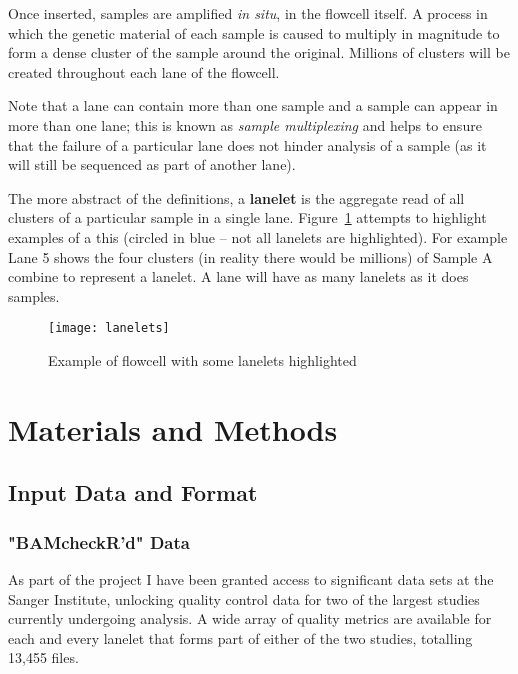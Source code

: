 Once inserted, samples are amplified \textit{in situ}, in the flowcell itself. A
process in which the genetic material of each sample is caused to multiply in
magnitude to form a dense cluster of the sample around the original. Millions of
clusters will be created throughout each lane of the flowcell.

Note that a lane can contain more than one sample and a sample can appear in
more than one lane; this is known as \textit{sample multiplexing} and helps to
ensure that the failure of a particular lane does not hinder analysis of a
sample (as it will still be sequenced as part of another lane).


The more abstract of the definitions, a \textbf{lanelet} is the aggregate read
of all clusters of a particular sample in a single lane.
Figure~\ref{fig:lanelets} attempts to highlight examples of a this (circled in
blue -- not all lanelets are highlighted). For example Lane 5 shows the four
clusters (in reality there would be millions) of Sample A combine to
represent a lanelet. A lane will have as many lanelets as it does samples.


\begin{figure}[htbp!]
    \centering
    \texttt{[image: lanelets]}
    \caption[lanelets]{Example of flowcell with some lanelets highlighted}
    \label{fig:lanelets}
\end{figure}


\chapter{Materials and Methods}
\section{Input Data and Format}
\subsection{"BAMcheckR'd" Data}
\label{chap:bamcheckr-data}

As part of the project I have been granted access to significant data sets at the
Sanger Institute, unlocking quality control data for two of the largest studies
currently undergoing analysis. A wide array of quality metrics are available for
each and every lanelet that forms part of either of the two studies, totalling
13,455 files.

